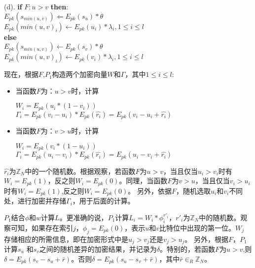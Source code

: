 \begin{algorithm}[ht]
\begin{algorithmic}[1]
     (d).\hspace{0.1cm} \textbf{if} $F:u>v$ \textbf{then}:\\
     \hspace{1cm} $E_{pk}(s_{min(u,v)}) \Leftarrow E_{pk}(s_u)*\theta$\\
     \hspace{1cm} $E_{pk}(min(u,v)_i) \leftarrow E_{pk}(u_i)*\lambda_i,1 \leq i \leq l$\\
     \hspace{0.6cm}\textbf{else}\\
     \hspace{1cm} $E_{pk}(s_{min(u,v)}) \leftarrow E_{pk}(s_v)* \theta$\\
     \hspace{1cm} $E_{pk}(min(u,v)_i) \leftarrow E_{pk}(v_i)*\lambda_i,1 \leq i \leq l$
\end{algorithmic}
\end{algorithm}

现在，根据$F$,$P_1$构造两个加密向量$W$和$\Gamma$，其中$1 \leq i \leq l$:
\begin{itemize}
\item 当函数$F$为：$u>v$时，计算
\begin{center}
      $W_i=E_{pk}(u_i * (1-v_i))$\\
      $\Gamma_i = E_{pk}(v_i-u_i)*E_{pk}(\hat{r_i})=E_{pk}(v_i-u_i+\hat{r_i})$
\end{center}
\item 当函数$F$为：$v>u$时，计算
\begin{center}
      $W_i=E_{pk}(v_i*(1-u_i))$\\
      $\Gamma_i = E_{pk}(u_i-v_i)*E_{pk}(\hat{r_i})=E_{pk}(u_i-v_i+\hat{r_i})$
\end{center}
\end{itemize}
$\hat{r_i}$为$\mathbb{Z}_N$中的一个随机数。根据观察，若函数$F$为$u>v$，当且仅当$u_i >v_i$时有$W_i=E_{pk}(1)$，反之则$W_i=E_{pk}(0)$。同理，当函数$F$为$v>u$，当且仅当$v_i >u_i$时有$W_i=E_{pk}(1)$,反之则$W_i=E_{pk}(0)$。 另外，依据$F$，随机选取$u_i$和$v_i$不同处，进行加密并存储$\Gamma_i$，用于后面的计算。

$P_1$结合$\phi$和$w$计算$L$。更准确的说，$P_1$计算$L_i=W_i * \phi^{r'_i}_i$，$r'_i$为$\mathbb{Z}_N$中的随机数。观察可知，如果存在索引$j$，$\phi_j=E_{pk}(0)$，表示$u$和$v$比特位中出现的第一位。$W_j$ 存储相应的所需信息，即在加密形式中是$u_j >v_j$还是$v_j >u_j$。 另外，根据$F$，$P_1$计算$s_u$ 和$s_v$之间的随机差异的加密结果，并记录为$\delta$。特别的，若函数$F$为$u>v$,则$\delta = E_{pk}(s_v-s_u+\bar{r})$。否则$\delta=E_{pk}(s_u-s_v+\bar{r})$，其中$\bar{r} \in_R \mathbb{Z}_N$。


